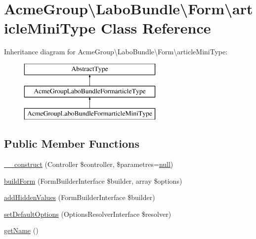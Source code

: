 \hypertarget{class_acme_group_1_1_labo_bundle_1_1_form_1_1article_mini_type}{\section{Acme\+Group\textbackslash{}Labo\+Bundle\textbackslash{}Form\textbackslash{}article\+Mini\+Type Class Reference}
\label{class_acme_group_1_1_labo_bundle_1_1_form_1_1article_mini_type}
}
Inheritance diagram for Acme\+Group\textbackslash{}Labo\+Bundle\textbackslash{}Form\textbackslash{}article\+Mini\+Type\+:\begin{figure}[H]
\begin{center}
\leavevmode
\includegraphics[height=3.000000cm]{class_acme_group_1_1_labo_bundle_1_1_form_1_1article_mini_type}
\end{center}
\end{figure}
\subsection*{Public Member Functions}
\begin{DoxyCompactItemize}
\item 
\hyperlink{class_acme_group_1_1_labo_bundle_1_1_form_1_1article_mini_type_a240e9e7edf3d52eb96767f22f2c9980e}{\+\_\+\+\_\+construct} (Controller \$controller, \$parametres=\hyperlink{validate_8js_afb8e110345c45e74478894341ab6b28e}{null})
\item 
\hyperlink{class_acme_group_1_1_labo_bundle_1_1_form_1_1article_mini_type_ae9dce2ed7443d0b6ae2110b39296eb12}{build\+Form} (Form\+Builder\+Interface \$builder, array \$options)
\item 
\hyperlink{class_acme_group_1_1_labo_bundle_1_1_form_1_1article_mini_type_a80b547cfef4a1b14e3c48d2df127034e}{add\+Hidden\+Values} (Form\+Builder\+Interface \$builder)
\item 
\hyperlink{class_acme_group_1_1_labo_bundle_1_1_form_1_1article_mini_type_a1d261cd3cff2da6d89f35c1639deac6c}{set\+Default\+Options} (Options\+Resolver\+Interface \$resolver)
\item 
\hyperlink{class_acme_group_1_1_labo_bundle_1_1_form_1_1article_mini_type_aea340362e73a56c1e436ef86fac5ad83}{get\+Name} ()
\end{DoxyCompactItemize}


